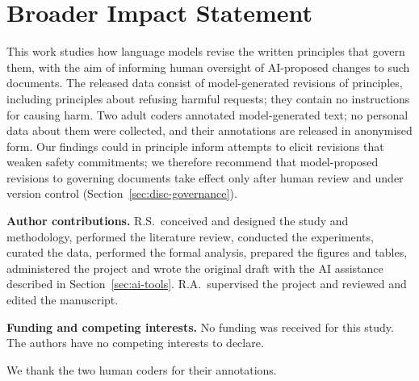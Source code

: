 \documentclass[manuscript, screen, review]{jair}
\begin{document}



\maketitle








\section*{Broader Impact Statement}
This work studies how language models revise the written principles that govern them, with the aim of informing human oversight of AI-proposed changes to such documents. The released data consist of model-generated revisions of principles, including principles about refusing harmful requests; they contain no instructions for causing harm. Two adult coders annotated model-generated text; no personal data about them were collected, and their annotations are released in anonymised form. Our findings could in principle inform attempts to elicit revisions that weaken safety commitments; we therefore recommend that model-proposed revisions to governing documents take effect only after human review and under version control (Section~\ref{sec:disc-governance}).

\begin{acks}
\textbf{Author contributions.} R.S.\ conceived and designed the study and methodology, performed the literature review, conducted the experiments, curated the data, performed the formal analysis, prepared the figures and tables, administered the project and wrote the original draft with the AI assistance described in Section~\ref{sec:ai-tools}. R.A.\ supervised the project and reviewed and edited the manuscript.

\textbf{Funding and competing interests.} No funding was received for this study. The authors have no competing interests to declare.

We thank the two human coders for their annotations.
\end{acks}

\printbibliography

\appendix











\end{document}
